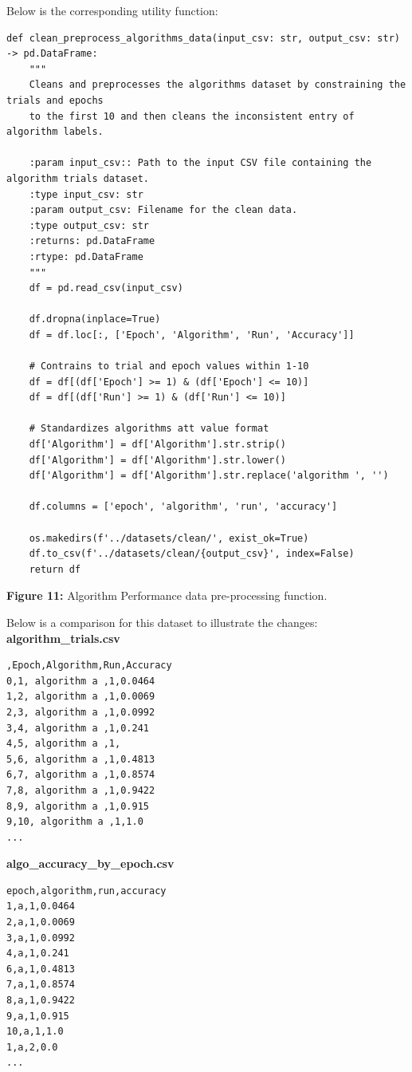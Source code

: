 Below is the corresponding utility function:\\
 
\begin{verbatim}
def clean_preprocess_algorithms_data(input_csv: str, output_csv: str) -> pd.DataFrame:
    """
    Cleans and preprocesses the algorithms dataset by constraining the trials and epochs
    to the first 10 and then cleans the inconsistent entry of algorithm labels.

    :param input_csv:: Path to the input CSV file containing the algorithm trials dataset.
    :type input_csv: str
    :param output_csv: Filename for the clean data.
    :type output_csv: str
    :returns: pd.DataFrame
    :rtype: pd.DataFrame
    """
    df = pd.read_csv(input_csv)

    df.dropna(inplace=True)
    df = df.loc[:, ['Epoch', 'Algorithm', 'Run', 'Accuracy']]

    # Contrains to trial and epoch values within 1-10
    df = df[(df['Epoch'] >= 1) & (df['Epoch'] <= 10)]
    df = df[(df['Run'] >= 1) & (df['Run'] <= 10)]

    # Standardizes algorithms att value format
    df['Algorithm'] = df['Algorithm'].str.strip()
    df['Algorithm'] = df['Algorithm'].str.lower()
    df['Algorithm'] = df['Algorithm'].str.replace('algorithm ', '')

    df.columns = ['epoch', 'algorithm', 'run', 'accuracy']

    os.makedirs(f'../datasets/clean/', exist_ok=True)
    df.to_csv(f'../datasets/clean/{output_csv}', index=False)
    return df
\end{verbatim}

\begin{center}
\textbf{Figure 11:} Algorithm Performance data pre-processing function.
\end{center}

Below is a comparison for this dataset to illustrate the changes:\\

\noindent\textbf{algorithm\_trials.csv}
\begin{verbatim}
,Epoch,Algorithm,Run,Accuracy
0,1, algorithm a ,1,0.0464
1,2, algorithm a ,1,0.0069
2,3, algorithm a ,1,0.0992
3,4, algorithm a ,1,0.241
4,5, algorithm a ,1,
5,6, algorithm a ,1,0.4813
6,7, algorithm a ,1,0.8574
7,8, algorithm a ,1,0.9422
8,9, algorithm a ,1,0.915
9,10, algorithm a ,1,1.0
...
\end{verbatim}

\noindent\textbf{algo\_accuracy\_by\_epoch.csv}
\begin{verbatim}
epoch,algorithm,run,accuracy
1,a,1,0.0464
2,a,1,0.0069
3,a,1,0.0992
4,a,1,0.241
6,a,1,0.4813
7,a,1,0.8574
8,a,1,0.9422
9,a,1,0.915
10,a,1,1.0
1,a,2,0.0
...
\end{verbatim}

